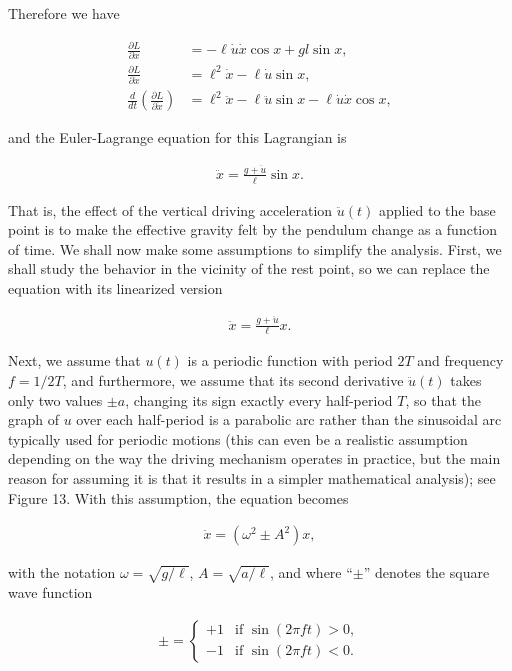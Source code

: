 \documentclass[11pt]{report}
\theoremstyle{plain}
\theoremstyle{definition}
\begin{document}
Therefore we have

\begin{align*}
\frac{\partial L}{\partial x} &= -\ell \dot{u}\dot{x}\cos x + gl\sin x,
\\
\frac{\partial L}{\partial \dot{x}} &= \ell^2 \dot{x} - \ell \dot{u}\sin x,
\\
\frac{d}{dt}\left(\frac{\partial L}{\partial \dot{x}}\right) &= \ell^2 \ddot{x} - \ell \ddot{u}\sin x - \ell \dot{u}\dot{x} \cos x,
\end{align*}

and the Euler-Lagrange equation for this Lagrangian
is

\begin{align*}
\ddot{x} =\frac{g+\ddot{u}}{\ell} \sin x.
\end{align*}

That is, the effect of the vertical driving
acceleration $\ddot{u}(t)$ applied to the base point
is to make the effective gravity felt by the pendulum
change as a function of time. We shall now make some
assumptions to simplify the analysis. First, we shall
study the behavior in the vicinity of the rest point,
so we can replace the equation with its linearized
version

\begin{align*}
\ddot{x} = \frac{g+\ddot{u}}{\ell} x.
\end{align*}

Next, we assume that $u(t)$ is a periodic function
with period $2T$ and frequency $f = 1/2T$, and
furthermore, we assume that its second derivative
$\ddot{u}(t)$ takes only two values $\pm a$, changing
its sign exactly every half-period $T$, so that the
graph of $u$ over each half-period is a parabolic arc
rather than the sinusoidal arc typically used for
periodic motions (this can even be a realistic
assumption depending on the way the driving mechanism
operates in practice, but the main reason for assuming
it is that it results in a simpler mathematical
analysis); see Figure 13. With this assumption, the
equation becomes

\begin{align*}
\ddot{x} = (\omega^2 \pm A^2) x,
\end{align*}

with the notation $\omega=\sqrt{g/\ell}$,
$A=\sqrt{a/\ell}$, and where ``$\pm$'' denotes the
square wave function

\begin{align*}
\pm = \begin{cases} +1 & \textrm{if }\sin(2\pi f t)>0, \\ -1 &
\textrm{if }\sin(2\pi f t)<0.
\end{cases}
\end{align*}
\end{document}
